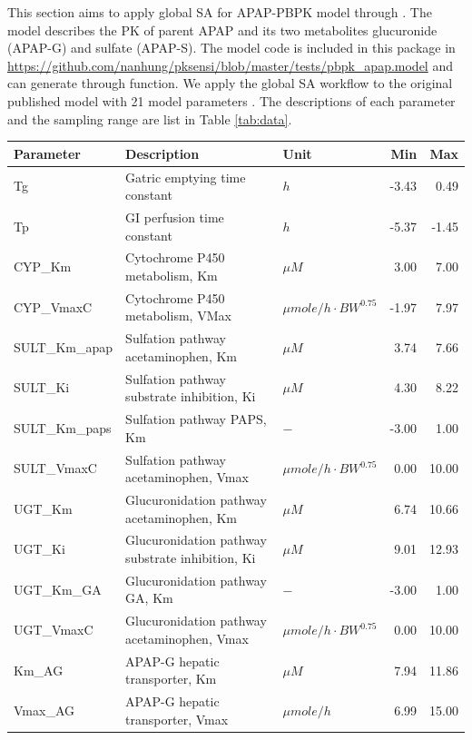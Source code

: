 This section aims to apply global SA for APAP-PBPK model through
. The model describes the PK of parent APAP and its two
metabolites glucuronide (APAP-G) and sulfate (APAP-S). The model code is
included in this package in
\url{https://github.com/nanhung/pksensi/blob/master/tests/pbpk_apap.model}
and can generate through  function. We apply the
global SA workflow to the original published model with 21 model
parameters \citep{s13318-015-0253-x}. The descriptions of each parameter
and the sampling range are list in Table \ref{tab:data}.

\begin{table}[ht]
\centering
\begingroup\fontsize{8pt}{9pt}\selectfont
\begin{tabular}{lllrr}
  \hline
Parameter & Description & Unit & Min & Max \\ 
  \hline
Tg & Gatric emptying time constant & $h$ & -3.43 & 0.49 \\ 
  Tp & GI perfusion time constant & $h$ & -5.37 & -1.45 \\ 
  CYP\_Km & Cytochrome P450 metabolism, Km & $\mu{M}$ & 3.00 & 7.00 \\ 
  CYP\_VmaxC & Cytochrome P450 metabolism, VMax & $\mu{mole}/h\cdot{BW}^{0.75}$ & -1.97 & 7.97 \\ 
  SULT\_Km\_apap & Sulfation pathway acetaminophen, Km & $\mu{M}$ & 3.74 & 7.66 \\ 
  SULT\_Ki & Sulfation pathway substrate inhibition, Ki & $\mu{M}$ & 4.30 & 8.22 \\ 
  SULT\_Km\_paps & Sulfation pathway PAPS, Km & $-$ & -3.00 & 1.00 \\ 
  SULT\_VmaxC & Sulfation pathway acetaminophen, Vmax & $\mu{mole}/h\cdot{BW}^{0.75}$ & 0.00 & 10.00 \\ 
  UGT\_Km & Glucuronidation pathway acetaminophen, Km & $\mu{M}$ & 6.74 & 10.66 \\ 
  UGT\_Ki & Glucuronidation pathway substrate inhibition, Ki & $\mu{M}$ & 9.01 & 12.93 \\ 
  UGT\_Km\_GA & Glucuronidation pathway GA, Km & $-$ & -3.00 & 1.00 \\ 
  UGT\_VmaxC & Glucuronidation pathway acetaminophen, Vmax & $\mu{mole}/h\cdot{BW}^{0.75}$ & 0.00 & 10.00 \\ 
  Km\_AG & APAP-G hepatic transporter, Km & $\mu{M}$ & 7.94 & 11.86 \\ 
  Vmax\_AG & APAP-G hepatic transporter, Vmax & $\mu{mole}/h$ & 6.99 & 15.00 \\ 

\end{tabular}
\end{table}

